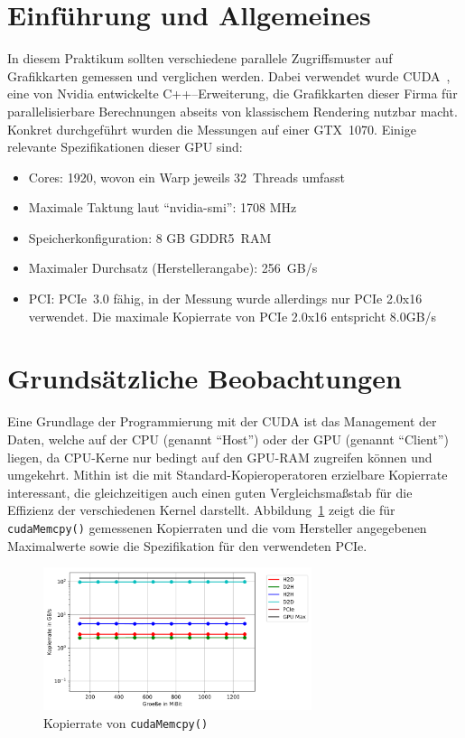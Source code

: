 \documentclass[11pt, abstract=on]{scrartcl}
\begin{document}
\lstset{language=[11]C++}   

\section{Einführung und Allgemeines}
In diesem Praktikum sollten verschiedene parallele Zugriffsmuster auf Grafikkarten gemessen und verglichen werden. Dabei verwendet wurde CUDA~\cite{CUDA}, eine von Nvidia entwickelte C++--Erweiterung, die Grafikkarten dieser Firma für parallelisierbare Berechnungen abseits von klassischem Rendering nutzbar macht. Konkret durchgeführt wurden die Messungen auf einer GTX~1070. Einige relevante Spezifikationen dieser GPU sind:
\begin{itemize}
	\item Cores: 1920, wovon ein Warp jeweils 32~Threads umfasst~\cite{GPUSpecs}
	\item Maximale Taktung laut "`nvidia-smi"': 1708 MHz~\cite{GPUSpecs}
	\item Speicherkonfiguration: 8 GB GDDR5~RAM~\cite{GPUSpecs}
	\item Maximaler Durchsatz (Herstellerangabe): 256~GB/s~\cite{GPUSpecs}
	\item PCI: PCIe~3.0 fähig, in der Messung wurde allerdings nur PCIe 2.0x16 verwendet. Die maximale Kopierrate von PCIe 2.0x16 entspricht 8.0GB/s~\cite{PCIeSpecs}
\end{itemize}


\section{Grundsätzliche Beobachtungen}
Eine Grundlage der Programmierung mit der CUDA ist das Management der Daten, welche auf der CPU (genannt "`Host"') oder der GPU (genannt "`Client"') liegen, da CPU-Kerne nur bedingt auf den GPU-RAM zugreifen können und umgekehrt. Mithin ist die mit Standard-Kopieroperatoren erzielbare Kopierrate interessant, die gleichzeitigen auch einen guten Vergleichsmaßstab für die Effizienz der verschiedenen Kernel darstellt. Abbildung~\ref{fig:Kopierrate} zeigt die für \texttt{cudaMemcpy()} gemessenen Kopierraten und die vom Hersteller angegebenen Maximalwerte sowie die Spezifikation für den verwendeten PCIe.

\begin{figure} [htbp]
 	\centering
 		\includegraphics[width=0.7\textwidth]{Graph_Kopierrate.png}
 	\caption{Kopierrate von \texttt{cudaMemcpy()}}
 	\label{fig:Kopierrate}
\end{figure}
\end{document}
